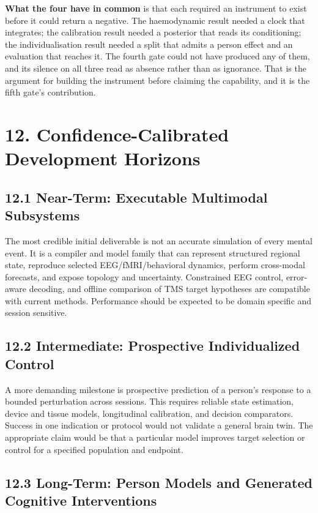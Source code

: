 \textbf{What the four have in common} is that each required an instrument to
exist before it could return a negative. The haemodynamic result needed a clock
that integrates; the calibration result needed a posterior that reads its
conditioning; the individualisation result needed a split that admits a person
effect and an evaluation that reaches it. The fourth gate could not have produced
any of them, and its silence on all three read as absence rather than as
ignorance. That is the argument for building the instrument before claiming the
capability, and it is the fifth gate's contribution.

\section{12. Confidence-Calibrated Development Horizons}

\subsection{12.1 Near-Term: Executable Multimodal Subsystems}

The most credible initial deliverable is not an accurate simulation of every
mental event. It is a compiler and model family that can represent structured
regional state, reproduce selected EEG/fMRI/behavioral dynamics, perform
cross-modal forecasts, and expose topology and uncertainty. Constrained EEG
control, error-aware decoding, and offline comparison of TMS target hypotheses
are compatible with current methods. Performance should be expected to be
domain specific and session sensitive.

\subsection{12.2 Intermediate: Prospective Individualized Control}

A more demanding milestone is prospective prediction of a person's response
to a bounded perturbation across sessions. This requires reliable state
estimation, device and tissue models, longitudinal calibration, and decision
comparators. Success in one indication or protocol would not validate a
general brain twin. The appropriate claim would be that a particular model
improves target selection or control for a specified population and endpoint.

\subsection{12.3 Long-Term: Person Models and Generated Cognitive Interventions}

